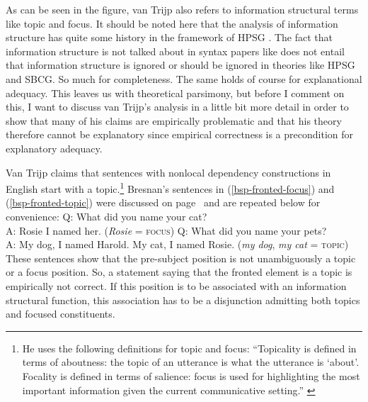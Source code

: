 As can be seen in the figure, van Trijp also refers to information structural terms
like topic and focus. It should be noted here that the analysis of information structure has quite
some history in the framework of HPSG  \citep{EV96a, 
Kuhn95b,Kuhn96a, 
GuntherMaienborn1999,
Wilcock2001a, 
deKuthy2002a,Paggio2005a-u, 
Bildhauer2008a,BC2010a}. The fact that information structure is not talked about in syntax
papers like  does not entail that information structure is ignored or should be
ignored in theories like HPSG and SBCG. So much for completeness. The same holds of course for
explanational adequacy. This leaves us with theoretical parsimony, but before I comment on this, I
want to discuss van Trijp's analysis in a little bit more detail in order to show that many of his claims
are empirically problematic and that his theory therefore cannot be explanatory since empirical
correctness is a precondition for explanatory adequacy.

Van Trijp claims that sentences with nonlocal dependency constructions in English start with a
topic.\footnote{
He uses the following definitions for topic and focus: ``Topicality is defined in terms of aboutness: the topic of an utterance
is what the utterance is `about'. Focality is defined in terms of salience:
focus is used for highlighting the most important information given the
current communicative setting.'' \citep[]{vanTrijp2014a}
} Bresnan's sentences in (\ref{bsp-fronted-focus}) and (\ref{bsp-fronted-topic}) were discussed on page~\pageref{bsp-fronted-focus}
\citep[]{Bresnan2001a} and are repeated below for convenience:
\ea
\label{bsp-fronted-focus-two}
Q: What did you name your cat?\\
A: Rosie I named her. (\emph{Rosie} = \textsc{focus})
\z
\ea
\label{bsp-fronted-topic-two}
Q: What did you name your pets?\\
A: My dog, I named Harold. My cat, I named Rosie. (\emph{my dog}, \emph{my cat} = \textsc{topic})
\z
These sentences show that the pre-subject position is not unambiguously a topic or a focus
position. So, a statement saying that the fronted element is a topic is empirically not correct. If this position is to be associated with an information structural function, this
association has to be a disjunction admitting both topics and focused constituents.

